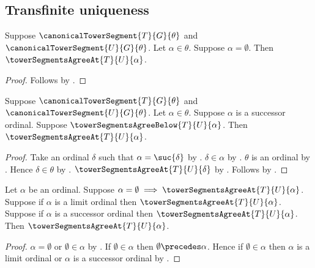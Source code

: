 \subsection{Transfinite uniqueness}

\begin{proposition}\label{canonical_tower_zero_agreement_case}
    Suppose $\canonicalTowerSegment{T}{G}{\theta}$ and
        $\canonicalTowerSegment{U}{G}{\theta}$.
    Let $\alpha\in\theta$.
    Suppose $\alpha=\emptyset$.
    Then $\towerSegmentsAgreeAt{T}{U}{\alpha}$.
\end{proposition}
\begin{proof}
    Follows by
        .
\end{proof}

\begin{proposition}\label{canonical_tower_successor_agreement_from_below}
    Suppose $\canonicalTowerSegment{T}{G}{\theta}$ and
        $\canonicalTowerSegment{U}{G}{\theta}$.
    Let $\alpha\in\theta$.
    Suppose $\alpha$ is a successor ordinal.
    Suppose $\towerSegmentsAgreeBelow{T}{U}{\alpha}$.
    Then $\towerSegmentsAgreeAt{T}{U}{\alpha}$.
\end{proposition}
\begin{proof}
    Take an ordinal $\delta$ such that $\alpha=\suc{\delta}$ by
        .
    $\delta\in\alpha$ by .
    $\theta$ is an ordinal by
        .
    Hence $\delta\in\theta$ by .
    $\towerSegmentsAgreeAt{T}{U}{\delta}$ by
        .
    Follows by
        .
\end{proof}

\begin{proposition}\label{tower_agreement_from_ordinal_cases}
    Let $\alpha$ be an ordinal.
    Suppose $\alpha=\emptyset\implies
        \towerSegmentsAgreeAt{T}{U}{\alpha}$.
    Suppose if $\alpha$ is a limit ordinal then
        $\towerSegmentsAgreeAt{T}{U}{\alpha}$.
    Suppose if $\alpha$ is a successor ordinal then
        $\towerSegmentsAgreeAt{T}{U}{\alpha}$.
    Then $\towerSegmentsAgreeAt{T}{U}{\alpha}$.
\end{proposition}
\begin{proof}
    $\alpha=\emptyset$ or $\emptyset\in\alpha$ by
        .
    If $\emptyset\in\alpha$ then
        $\emptyset\precedes\alpha$.
    Hence if $\emptyset\in\alpha$ then $\alpha$ is a limit ordinal or
        $\alpha$ is a successor ordinal by
        .
\end{proof}

